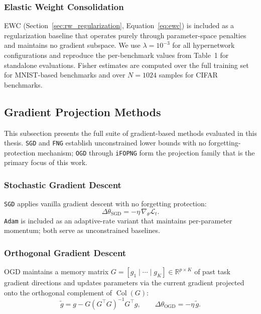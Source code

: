 \subsubsection{Elastic Weight Consolidation}
\label{sec:ewc}
EWC (Section~\ref{sec:rw_regularization}, Equation~\ref{eq:ewc}) is included as
a regularization baseline that operates purely through parameter-space
penalties and maintains no gradient subspace.
We use $\lambda = 10^{-3}$ for all hypernetwork configurations and
reproduce the per-benchmark values from \citet{garg_fisher-orthogonal_2026}
Table~1 for standalone evaluations.
Fisher estimates are computed over the full training set for MNIST-based
benchmarks and over $N{=}1024$ samples for CIFAR benchmarks.

\subsection{Gradient Projection Methods}
\label{sec:projection_methods}

This subsection presents the full suite of gradient-based methods evaluated
in this thesis.
\texttt{SGD} and \texttt{FNG} establish unconstrained lower bounds with no
forgetting-protection mechanism; \texttt{OGD} through \texttt{iFOPNG} form
the projection family that is the primary focus of this work.

\subsubsection{Stochastic Gradient Descent}
\texttt{SGD} applies vanilla gradient descent with no forgetting protection:
\begin{equation}
    \Delta\theta_{\mathrm{SGD}} = -\eta\,\nabla_\theta\mathcal{L}_t.
\end{equation}
\texttt{Adam} \citep{kingma_adam_2015} is included as an adaptive-rate
variant that maintains per-parameter momentum; both serve as unconstrained
baselines.

\subsubsection{Orthogonal Gradient Descent}
\label{sec:ogd}
OGD \citep{farajtabar_orthogonal_2019} maintains a memory matrix
$G = [g_1 \mid \cdots \mid g_K] \in \mathbb{R}^{p \times K}$ of past task
gradient directions and updates parameters via the current gradient
projected onto the orthogonal complement of $\operatorname{Col}(G)$:
\begin{equation}
    \tilde{g} = g - G(G^\top G)^{-1}G^\top g,
    \qquad
    \Delta\theta_{\mathrm{OGD}} = -\eta\,\tilde{g}.
\end{equation}

